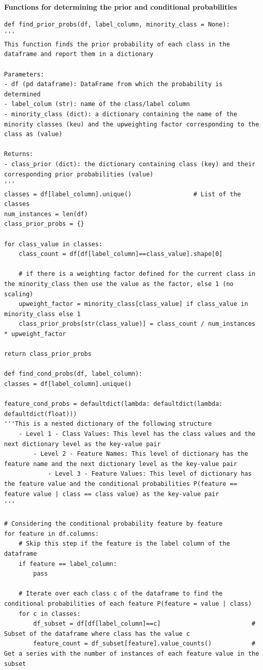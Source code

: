 \documentclass[a4paper]{article}
\begin{document}
\textbf{Functions for determining the prior and conditional probabilities}
\begin{lstlisting}
def find_prior_probs(df, label_column, minority_class = None):
'''
This function finds the prior probability of each class in the dataframe and report them in a dictionary

Parameters:
- df (pd dataframe): DataFrame from which the probability is determined
- label_colum (str): name of the class/label column
- minority_class (dict): a dictionary containing the name of the minority classes (keu) and the upweighting factor corresponding to the class as (value)

Returns:
- class_prior (dict): the dictionary containing class (key) and their corresponding prior probabilities (value)
'''
classes = df[label_column].unique()                 # List of the classes
num_instances = len(df)
class_prior_probs = {}

for class_value in classes:
    class_count = df[df[label_column]==class_value].shape[0]
    
    # if there is a weighting factor defined for the current class in the minority_class then use the value as the factor, else 1 (no scaling)
    upweight_factor = minority_class[class_value] if class_value in minority_class else 1      
    class_prior_probs[str(class_value)] = class_count / num_instances * upweight_factor

return class_prior_probs

def find_cond_probs(df, label_column):
classes = df[label_column].unique()

feature_cond_probs = defaultdict(lambda: defaultdict(lambda: defaultdict(float)))
'''This is a nested dictionary of the following structure
    - Level 1 - Class Values: This level has the class values and the next dictionary level as the key-value pair
        - Level 2 - Feature Names: This level of dictionary has the feature name and the next dictionary level as the key-value pair
            - Level 3 - Feature Values: This level of dictionary has the feature value and the conditional probabilities P(feature == feature value | class == class value) as the key-value pair 
'''

# Considering the conditional probability feature by feature
for feature in df.columns:
    # Skip this step if the feature is the label column of the dataframe
    if feature == label_column:
        pass
    
    # Iterate over each class c of the dataframe to find the conditional probabilities of each feature P(feature = value | class)
    for c in classes: 
        df_subset = df[df[label_column]==c]                         # Subset of the dataframe where class has the value c
        feature_count = df_subset[feature].value_counts()           # Get a series with the number of instances of each feature value in the subset


\end{lstlisting}
\end{document}
